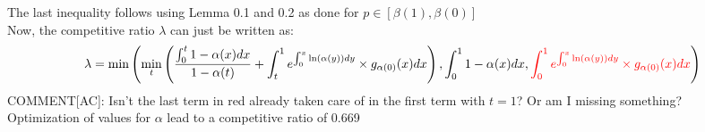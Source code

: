 \documentclass[10pt, letterpaper, twoside]{article}
\begin{document}
	The last inequality follows using Lemma 0.1 and 0.2 as done for $p \in [\beta(1),\beta(0)]$\\
	Now, the competitive ratio $\lambda$ can just be written as:
	\begin{align*}
	\lambda = \min \left(\min_{t}\left(\frac{\int_{0}^{t} 1 - \alpha(x) dx}{1-\alpha(t)} + \int_{t}^{1} e^{\int_{0}^{x} \ln(\alpha(y)) dy} \times g_{\alpha(0)}(x) dx \right), \int_{0}^{1} 1 - \alpha(x) dx, \textcolor{red}{\int_{0}^{1} e^{\int_{0}^{x} \ln(\alpha(y)) dy} \times g_{\alpha(0)}(x) dx} \right)
	\end{align*}
	COMMENT[AC]: Isn't the last term in red already taken care of in the first term with $t=1$? Or am I missing something?\\
	Optimization of values for $\alpha$ lead to a competitive ratio of 0.669
\end{document}
